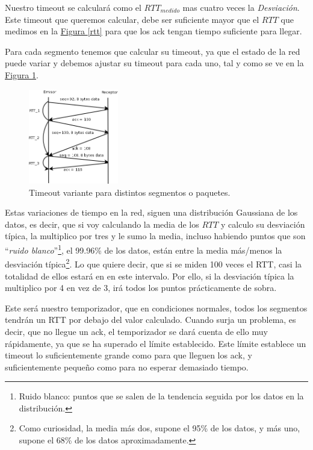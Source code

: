 \documentclass[10pt,a4paper,spanish]{report}
\begin{document}
Nuestro timeout se calculará como el $RTT_{medido}$ mas cuatro veces la \textit{\textcolor{tema3}{Desviación}}. Este timeout que queremos calcular, debe ser suficiente mayor que el $RTT$ que medimos en la \hyperref[rtt]{Figura \ref*{rtt}} para que los ack tengan  tiempo suficiente para llegar. 

Para cada segmento tenemos que calcular su timeout, ya que el estado de la red puede variar y debemos ajustar su timeout para cada uno, tal y como se ve en la \hyperref[rtt1]{Figura \ref*{rtt1}}.

  \begin{figure}[H]
    \centering
    \includegraphics[width=0.35\textwidth]{timeout_diagrama}
    \caption{Timeout variante para distintos segmentos o paquetes.}
    \label{rtt1}
  \end{figure}

Estas variaciones de tiempo en la red, siguen una distribución Gaussiana de los datos, es decir, que si voy calculando la media de los $RTT$ y calculo su desviación típica, la multiplico por tres y le sumo la media, incluso habiendo puntos que son ``\textit{\textcolor{tema3}{ruido blanco}}''\footnote{Ruido blanco: puntos que se salen de la tendencia seguida por los datos en la distribución.}, el 99.96\% de los datos, están entre la media más/menos la desviación típica\footnote{Como curiosidad, la media más dos, supone el 95\% de los datos, y más uno, supone el 68\% de los datos aproximadamente.}. Lo que quiere decir, que si se miden 100 veces el RTT, casi la totalidad de ellos estará en en este intervalo. Por ello, si la desviación típica la multiplico por 4 en vez de 3, irá todos los puntos prácticamente de sobra.

Este será nuestro temporizador, que en condiciones normales, todos los segmentos tendrán un RTT por debajo del valor calculado. Cuando surja un problema, es decir, que no llegue un ack, el temporizador se dará cuenta de ello muy rápidamente, ya que se ha superado el límite establecido. Este límite establece un timeout lo suficientemente grande como para que lleguen los ack, y suficientemente pequeño como para no esperar demasiado tiempo. 
\end{document}
